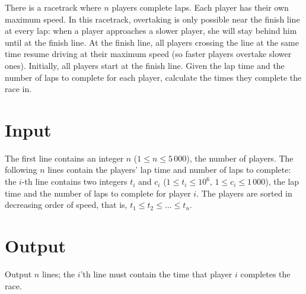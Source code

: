 

There is a racetrack where $n$ players complete laps.
Each player has their own maximum speed.
In this racetrack, overtaking is only possible near the finish line at every lap:
when a player approaches a slower player, she will stay behind him until at the finish line.
At the finish line, all players crossing the line at the same time resume driving at their maximum speed (so faster players overtake slower ones).
Initially, all players start at the finish line.
Given the lap time and the number of laps to complete for each player, calculate the times they complete the race in.

\section*{Input}
The first line contains an integer $n$ ($1 \leq n \leq 5\,000$), the number of players.
The following $n$ lines contain the players' lap time and number of laps to complete:
the $i$-th line contains two integers $t_i$ and $c_i$ ($1 \leq t_i \leq 10^6$, $1 \leq c_i \leq 1\,000$),
the lap time and the number of laps to complete for player $i$.
The players are sorted in decreasing order of speed, that is, $t_1 \leq t_2 \leq \ldots \leq t_n$.

\section*{Output}
Output $n$ lines; the $i$'th line must contain the time that player $i$ completes the race.

